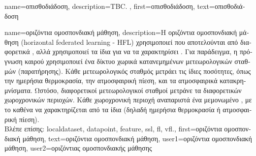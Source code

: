 {name={\foreignlanguage{greek}{οπισθοδιάδοση}},
 	description={TBC. },
 	first={\foreignlanguage{greek}{οπισθοδιάδοση}},
 	text={\foreignlanguage{greek}{οπισθοδιάδοση}}
}

{name={\foreignlanguage{greek}{οριζόντια ομοσπονδιακή μάθηση}},
	description={\foreignlanguage{greek}{Η οριζόντια ομοσπονδιακή μάθηση}\linebreak 
		(horizontal federated learning - HFL) \foreignlanguage{greek}{χρησιμοποιεί}  \foreignlanguage{greek}{που 
		αποτελούνται από διαφορετικά} , \foreignlanguage{greek}{αλλά χρησιμοποιεί τα ίδια}  
		\foreignlanguage{greek}{για να τα χαρακτηρίσει} \cite{HFLChapter2020}. \foreignlanguage{greek}{Για παράδειγμα, η πρόγνωση 
		καιρού χρησιμοποιεί ένα δίκτυο χωρικά κατανεμημένων μετεωρολογικών σταθμών (παρατήρησης). Κάθε μετεωρολογικός σταθμός  
		μετράει τις ίδιες ποσότητες, όπως την ημερήσια θερμοκρασία, την ατμοσφαιρική πίεση, και τα ατμοσφαιρικά κατακρημνίσματα.
		Ωστόσο, διαφορετικοί μετεωρολογικοί σταθ\-μοί μετράνε τα}  \foreignlanguage{greek}{διαφορετικών χωροχρονικών 
		περιοχών. Κάθε χωροχρονική περιοχή αναπαριστά ένα μεμονωμένο} , \foreignlanguage{greek}{με το καθένα 
		να χαρακτηρίζεται από τα ίδια}  \foreignlanguage{greek}{(δηλαδή ημερήσια θερμοκρασία ή ατμοσφαιρική πίεση).} 
		\\
		\foreignlanguage{greek}{Βλέπε επίσης:} \gls{localdataset}, \gls{datapoint}, \gls{feature}, \gls{ssl}, \gls{fl}, \gls{vfl}.},
	first={\foreignlanguage{greek}{οριζόντια ομοσπονδιακή μάθηση}},
	text={\foreignlanguage{greek}{οριζόντια ομοσπονδιακή μάθηση}},
	user1={\foreignlanguage{greek}{οριζόντια ομοσπονδιακή μάθηση}}, %
	user2={\foreignlanguage{greek}{οριζόντιας ομοσπονδιακής μάθησης}} %
}

